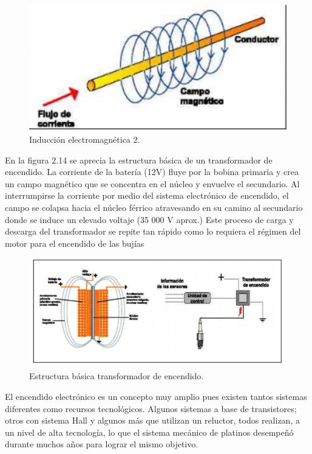 \begin{figure}[H]
\centering
\includegraphics[width=12cm]{capitulo3/figs/trans2.png}
\caption{ Inducción electromagnética 2.}
\end{figure}

En la figura 2.14 se aprecia la estructura básica de un transformador
de encendido. La corriente de la batería (12V) fluye por la bobina
primaria y crea un campo magnético que se concentra en el
núcleo y envuelve el secundario. Al interrumpirse la corriente
por medio del sistema electrónico de encendido, el campo se colapsa
hacia el núcleo férrico atravesando en su camino al 
secundario donde se induce un elevado voltaje (35 000 V aprox.) Este
proceso de carga y descarga del transformador se repite tan rápido como
lo requiera el régimen del motor para el encendido de las bujías


\begin{figure}[H]
\centering
\includegraphics[width=12cm]{capitulo3/figs/trans3.png}
\caption{ Estructura básica transformador de encendido.}
\end{figure}

El encendido electrónico es un concepto muy amplio pues existen
tantos sistemas diferentes como recursos tecnológicos. Algunos sistemas
a base de transistores; otros con sistema Hall y algunos más que utilizan
un reluctor, todos realizan, a un nivel de alta tecnología, lo que el sistema
mecánico de platinos desempeñó durante muchos años para lograr el
mismo objetivo.\\


